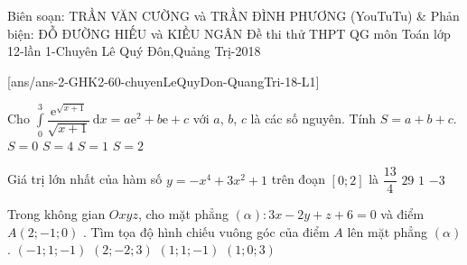 \begin{name}
	{Biên soạn: TRẦN VĂN CƯỜNG và TRẦN ĐÌNH PHƯƠNG (YouTuTu) \& Phản biện: ĐỖ ĐƯỜNG HIẾU và KIỀU NGÂN}
	{Đề thi thử THPT QG môn Toán lớp 12-lần 1-Chuyên Lê Quý Đôn,Quảng Trị-2018}
\end{name}
\setcounter{ex}{0}\setcounter{bt}{0}
[ans/ans-2-GHK2-60-chuyenLeQuyDon-QuangTri-18-L1]
\begin{ex}%
Cho $\displaystyle \int \limits_0^3 \dfrac{\mathrm{e}^{\sqrt{x+1}}}{\sqrt{x+1}}\mathrm{\, d}x =a\mathrm{e}^2+b\mathrm{e}+c$ với $a$, $b$, $c$ là các số nguyên. Tính $S =a+b+c$.
\choice
{\True $S =0$}
{$S =4$}
{$S =1$}
{$S =2$} 
\end{ex} 
\begin{ex}%
Giá trị lớn nhất của hàm số $y=-x^4+3x^2+1$ trên đoạn $ [0;2]$ là
\choice
{\True $\dfrac{13}{4}$}
{$29$}
{$1$}
{$-3$} 
\end{ex}
\begin{ex}%
Trong không gian $Oxyz$, cho mặt phẳng $(\alpha): 3x-2y+z+6=0$ và điểm $A(2;-1;0)$  . Tìm tọa độ hình chiếu vuông góc của điểm $A$ lên mặt phẳng $(\alpha)$.
\choice
{\True $(-1;1;-1)$}
{$(2;-2;3)$}
{$(1;1;-1)$}
{$(1;0;3)$} 
\end{ex}
